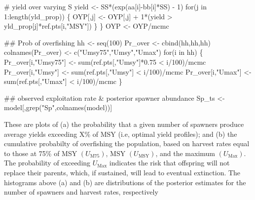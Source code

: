 \documentclass[
  11pt,
]{article}
\newenvironment{Shaded}{}{}
\newcommand{\CommentTok}[1]{\textcolor[rgb]{0.00,0.50,0.00}{#1}}
\newcommand{\ControlFlowTok}[1]{\textcolor[rgb]{0.00,0.00,1.00}{#1}}
\newcommand{\DecValTok}[1]{#1}
\newcommand{\FloatTok}[1]{#1}
\newcommand{\KeywordTok}[1]{\textcolor[rgb]{0.00,0.00,1.00}{#1}}
\newcommand{\NormalTok}[1]{#1}
\newcommand{\OperatorTok}[1]{#1}
\newcommand{\StringTok}[1]{\textcolor[rgb]{0.00,0.50,0.50}{#1}}
\begin{document}
\begin{Shaded}
\begin{Highlighting}[]
  \CommentTok{# yield over varying S}
\NormalTok{  yield <-}\StringTok{ }\NormalTok{SS}\OperatorTok{*}\NormalTok{(}\KeywordTok{exp}\NormalTok{(aa[i]}\OperatorTok{-}\NormalTok{bb[i]}\OperatorTok{*}\NormalTok{SS) }\OperatorTok{-}\StringTok{ }\DecValTok{1}\NormalTok{)}
  \ControlFlowTok{for}\NormalTok{(j }\ControlFlowTok{in} \DecValTok{1}\OperatorTok{:}\KeywordTok{length}\NormalTok{(yld_prop)) \{}
\NormalTok{    OYP[,j] <-}\StringTok{ }\NormalTok{OYP[,j] }\OperatorTok{+}\StringTok{ }\DecValTok{1}\OperatorTok{*}\NormalTok{(yield }\OperatorTok{>}\StringTok{ }\NormalTok{yld_prop[j]}\OperatorTok{*}\NormalTok{ref.pts[i,}\StringTok{"MSY"}\NormalTok{])}
\NormalTok{  \}}
\NormalTok{\}}
\NormalTok{OYP <-}\StringTok{ }\NormalTok{OYP}\OperatorTok{/}\NormalTok{mcmc}


\CommentTok{## Prob of overfishing}
\NormalTok{hh <-}\StringTok{ }\KeywordTok{seq}\NormalTok{(}\DecValTok{100}\NormalTok{)}
\NormalTok{Pr_over <-}\StringTok{ }\KeywordTok{cbind}\NormalTok{(hh,hh,hh)}
\KeywordTok{colnames}\NormalTok{(Pr_over) <-}\StringTok{ }\KeywordTok{c}\NormalTok{(}\StringTok{"Umsy75"}\NormalTok{,}\StringTok{"Umsy"}\NormalTok{,}\StringTok{"Umax"}\NormalTok{)}
\ControlFlowTok{for}\NormalTok{(i }\ControlFlowTok{in}\NormalTok{ hh) \{}
\NormalTok{  Pr_over[i,}\StringTok{"Umsy75"}\NormalTok{] <-}\StringTok{ }\KeywordTok{sum}\NormalTok{(ref.pts[,}\StringTok{"Umsy"}\NormalTok{]}\OperatorTok{*}\FloatTok{0.75} \OperatorTok{<}\StringTok{ }\NormalTok{i}\OperatorTok{/}\DecValTok{100}\NormalTok{)}\OperatorTok{/}\NormalTok{mcmc}
\NormalTok{  Pr_over[i,}\StringTok{"Umsy"}\NormalTok{] <-}\StringTok{ }\KeywordTok{sum}\NormalTok{(ref.pts[,}\StringTok{"Umsy"}\NormalTok{] }\OperatorTok{<}\StringTok{ }\NormalTok{i}\OperatorTok{/}\DecValTok{100}\NormalTok{)}\OperatorTok{/}\NormalTok{mcmc}
\NormalTok{  Pr_over[i,}\StringTok{"Umax"}\NormalTok{] <-}\StringTok{ }\KeywordTok{sum}\NormalTok{(ref.pts[,}\StringTok{"Umax"}\NormalTok{] }\OperatorTok{<}\StringTok{ }\NormalTok{i}\OperatorTok{/}\DecValTok{100}\NormalTok{)}\OperatorTok{/}\NormalTok{mcmc}
\NormalTok{\}}

\CommentTok{## observed exploitation rate & posterior spawner abundance}
\NormalTok{Sp_ts <-}\StringTok{ }\NormalTok{model[,}\KeywordTok{grep}\NormalTok{(}\StringTok{"Sp"}\NormalTok{,}\KeywordTok{colnames}\NormalTok{(model))]}
\end{Highlighting}
\end{Shaded}

These are plots of (a) the probability that a given number of spawners
produce average yields exceeding X\% of MSY (i.e, optimal yield
profiles); and (b) the cumulative probabilty of overfishing the
population, based on harvest rates equal to those at 75\% of MSY
\((U_{\text{M75}})\), MSY \((U_{\text{MSY}})\), and the maximum
\((U_{\text{Max}})\). The probability of exceeding \(U_{\text{Max}}\)
indicates the risk that offspring will not replace their parents, which,
if sustained, will lead to eventual extinction. The histograms above (a)
and (b) are distributions of the posterior estimates for the number of
spawners and harvest rates, respectively
\end{document}

